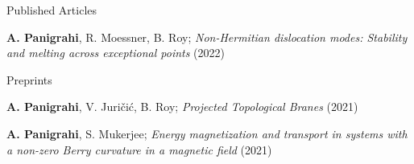 

\begin{cventries}

  \cventry
    {Published Articles} %
    {} %
    {} %
    {} %
    {
	  \begin{cvitems} %
      	\item{\textbf{A. Panigrahi}, R. Moessner, B. Roy; \textit{Non-Hermitian dislocation modes: Stability and melting across exceptional points} (2022) }
      \end{cvitems}
    }

  \cventry
	{Preprints} %
	{} %
	{} %
	{} %
	{
	  \begin{cvitems} %
		\item{\textbf{A. Panigrahi}, V. Juri\v{c}i\'c, B. Roy; \textit{Projected Topological Branes} (2021)}
		\item{\textbf{A. Panigrahi}, S. Mukerjee; \textit{Energy magnetization and transport in systems with a non-zero Berry curvature in a magnetic field} (2021)
		}
	\end{cvitems}
}

\end{cventries}
